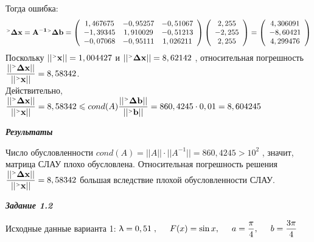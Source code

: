 \documentclass[12pt]{article}
\begin{document}
Тогда ошибка:
\begin{equation*}
\mathbf{^{\mathsmaller{>}} \Delta x=A^{-1} {}^\mathsmaller{>} \Delta b} = 
	\left(
\begin{array}{ccc}
	1,467675 & -0,95257 & -0,51067 \\
	-1,39345 & 1,910029 & -0,51213 \\
	-0,07068 & -0,95111	& 1,026211 \\
\end{array}
\right)
\left(
\begin{array}{c}
	2,255\\
	-2,255\\
	2,255\\
\end{array}
\right)
=
\left(
\begin{array}{c}
	4,306091\\
	-8,60421\\
	4,299476\\
\end{array}
\right)
\end{equation*}
Поскольку $||\mathbf{^{\mathsmaller{>}} x}|| = 1,004427$ и 
$||\mathbf{^{\mathsmaller{>}} \Delta x}|| = 8, 62142$ , относительная погрешность $\dfrac{||\mathbf{^{\mathsmaller{>}} \Delta x}||}{||\mathbf{^{\mathsmaller{>}} x}||} = 8,58342$. \\
Действительно, $\dfrac{||\mathbf{^{\mathsmaller{>}} \Delta x}||}{||\mathbf{^{\mathsmaller{>}} x}||} = 8,58342 \leqslant cond(A) 
\dfrac{||\mathbf{^{\mathsmaller{>}} \Delta b}||}{||\mathbf{^{\mathsmaller{>}} b}||} = 
860,4245 \cdot 0,01 = 8,604245$
\begin{center}
	\textbf{\textit{Результаты}}
\end{center}
Число обусловленности $cond\left(A\right)=||A|| \cdot ||A^{-1}|| = 860,4245 > 10^2 $ , значит, матрица СЛАУ плохо
обусловлена. Относительная погрешность решения $\dfrac{||\mathbf{^{\mathsmaller{>}} \Delta x}||}{||\mathbf{^{\mathsmaller{>}} x}||} = 8,58342 $ большая
вследствие плохой обусловленности СЛАУ.

\begin{center}
	\textbf{\textit{Задание 1.2}}
\end{center}
Исходные данные варианта 1: $\uplambda=0,51 \hspace{0.1cm} , \hspace{0.5cm}  F(x)=\sin{x},
\hspace{0.5cm} a=\dfrac{\pi}{4},
\hspace{0.5cm} b=\dfrac{3\pi}{4}$ \\ 
\end{document}
